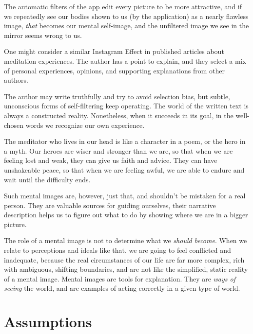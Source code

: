 The automatic filters of the app edit every picture to be more
attractive, and if we repeatedly see our bodies shown to us (by the
application) as a nearly flawless image, \emph{that} becomes our mental
self-image, and the unfiltered image we see in the mirror seems wrong to
us.

One might consider a similar Instagram Effect in published articles
about meditation experiences. The author has a point to explain, and
they select a mix of personal experiences, opinions, and supporting
explanations from other authors.

The author may write truthfully and try to avoid selection bias, but
subtle, unconscious forms of self-filtering keep operating. The world of
the written text is always a constructed reality. Nonetheless, when it
succeeds in its goal, in the well-chosen words we recognize our own
experience.

\clearpage


The meditator who lives in our head is like a character in a poem, or
the hero in a myth. Our heroes are wiser and stronger than we are, so
that when we are feeling lost and weak, they can give us faith and
advice. They can have unshakeable peace, so that when we are feeling
awful, we are able to endure and wait until the difficulty ends.

Such mental images are, however, just that, and shouldn't be mistaken
for a real person. They are valuable sources for guiding ourselves,
their narrative description helps us to figure out what to do by showing
where we are in a bigger picture.

The role of a mental image is not to determine what we \emph{should
become}. When we relate to perceptions and ideals like that, we are
going to feel conflicted and inadequate, because the real circumstances
of our life are far more complex, rich with ambiguous, shifting
boundaries, and are not like the simplified, static reality of a mental
image. Mental images are tools for explanation. They are \emph{ways of
seeing} the world, and are examples of acting correctly in a given type
of world.

\clearpage

\section{Assumptions}


